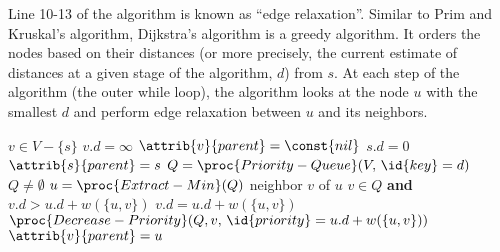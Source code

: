 Line 10-13 of the algorithm is known as ``edge relaxation''. Similar to Prim and Kruskal's algorithm, Dijkstra's algorithm is a greedy algorithm.  It orders the nodes based on their distances (or more precisely, the current estimate of distances at a given stage of the algorithm, $d$) from $s$. At each step of the algorithm (the outer while loop), the algorithm looks at the node $u$ with the smallest $d$ and perform edge relaxation between $u$ and its neighbors.

\begin{codebox}
    \li \For $v \in V - \{s\}$ \Do
        \li $v.d = \infty$
        \li $\attrib{v}{parent} = \const{nil}$
        \End
    \li $s.d = 0$
    \li $\attrib{s}{parent} = s$
    \li $Q = \proc{Priority-Queue}(V,\, \id{key}=d)$
    \li \While $Q \neq \emptyset$ \Do
        \li $u = \proc{Extract-Min}(Q)$
        \li \For neighbor $v$ of $u$ \Do
            \li \If $v \in Q$ \textbf{and} $v.d > u.d + w(\{u,v\})$ \Then
                \li $v.d = u.d + w(\{u,v\})$
                \li $\proc{Decrease-Priority}(Q,v,\, \id{priority}=u.d+w(\{u,v\}))$
                \li $\attrib{v}{parent} = u$   
\end{codebox}
